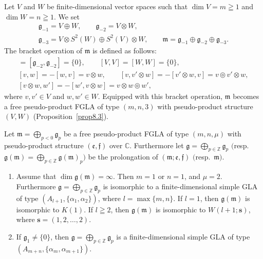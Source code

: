 \documentclass[pdftex]{sigma}
\numberwithin{equation}{section}
\numberwithin{theorem}{section}
\numberwithin{proposition}{section}
\numberwithin{lemma}{section}
\numberwithin{corollary}{section}
\numberwithin{definition}{section}
\numberwithin{example}{section}
\numberwithin{remark}{section}
\numberwithin{note}{section}
\newcommand{\gla}[1]{\mathfrak#1=\bigoplus\limits_{p\in\mathbb Z}\mathfrak#1_p} \renewcommand{\labelenumi}{{\rm (\arabic{enumi})}}
\begin{document}
\begin{example}
Let $V$ and $W$ be f\/inite-dimensional vector spaces
such that $\dim V=m\geqq1$ and $\dim W=n\geqq1$.
We set
\begin{gather*}
\mathfrak g_{-1}  =V\oplus W, \qquad \mathfrak g_{-2}=V\otimes W, \\
\mathfrak g_{-3}  = V\otimes S^2(W)\oplus S^2(V)\otimes W,
\qquad \mathfrak m=\mathfrak g_{-1}\oplus \mathfrak g_{-2}\oplus
\mathfrak g_{-3}.
\end{gather*}
The bracket operation of $\mathfrak m$ is def\/ined as follows:
 \begin{gather*}
  [\mathfrak g_{-3},\mathfrak g_{-1}\oplus \mathfrak g_{-2}]
=[\mathfrak g_{-2},\mathfrak g_{-2}]=\{0\},  \qquad [V,V]=[W,W]=\{0\},\\
[v,w]=-[w,v]=v\otimes w, \qquad
  [v,v'\otimes w]=-[v'\otimes w,v]=v\circledcirc v'\otimes w,
\\ [v\otimes w,w']=-[w',v\otimes w]=v\otimes w\circledcirc w',
\end{gather*}
where $v,v'\in V$ and $w,w'\in W$.
Equipped with this bracket operation, $\mathfrak m$ becomes
a free pseudo-product FGLA of type $(m,n,3)$ with pseudo-product structure
$(V,W)$ (Proposition~\ref{prop8.3}).
\end{example}

\begin{theorem}\label{thm8.1}
Let $\mathfrak m=\bigoplus\limits_{p<0}\mathfrak g_p$ be a free
pseudo-product FGLA of type $(m,n,\mu)$ with
pseudo-product structure $(\mathfrak e,\mathfrak f)$ over $\mathbb C$.
Furthermore let
$\gla g$
$($resp.\
$\mathfrak g(\mathfrak m)
=\bigoplus\limits_{p\in\mathbb Z}\mathfrak g(\mathfrak m)_p)$
be the prolongation of $(\mathfrak m;\mathfrak e,\mathfrak f)$
$($resp.~$\mathfrak m)$.
\begin{enumerate}\itemsep=0pt
\item Assume that $\dim \mathfrak g(\mathfrak m)=\infty$.
Then $m=1$ or $n=1$, and $\mu=2$.
Furthermore $\gla g$ is isomorphic to
a finite-dimensional simple GLA of type $(A_{l+1},\{\alpha_1,\alpha_2\})$,
where $l=\max\{m,n\}$.
If $l=1$, then $\mathfrak g(\mathfrak m)$
is isomorphic to $K(1)$.
If $l\geqq2$, then $\mathfrak g(\mathfrak m)$
is isomorphic to $W(l+1;\bm s)$,
where $\bm s=(1,2,\dots,2)$.
\item
If $\mathfrak g_{1}\!\ne\!\{0\}$, then $\gla g$
is a finite-dimensional simple GLA of type
$(A_{m{+}n},\{\alpha_m,\alpha_{m{+}1}\}).\!$
\end{enumerate}
\end{theorem}
\end{document}
